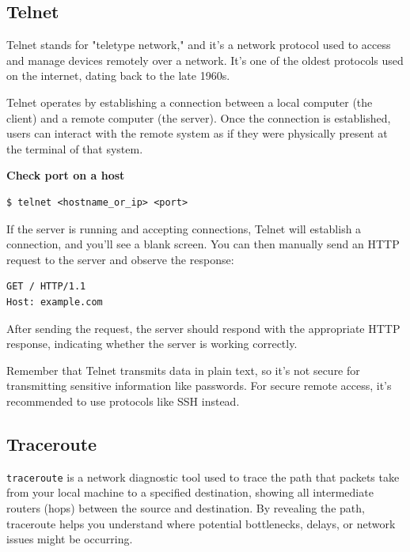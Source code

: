 \documentclass{article}
\newenvironment{blocktemplateIII}[1]{%
    \tcolorbox[beamer,%
    noparskip,breakable,
    ,colframe=Red,%
    colbacklower=LimeGreen!75!LightGreen,%
    title=#1]}%
    {\endtcolorbox}
\newenvironment{codetemplate}[1][]{%
  \mybasecolorbox[#1]
  \itshape
}{%
  \endmybasecolorbox
}
\begin{document}
\subsection{Telnet}

Telnet stands for "teletype network," and it's a network protocol used to access and manage devices remotely over a network. It's one of the oldest protocols used on the internet, dating back to the late 1960s.

Telnet operates by establishing a connection between a local computer (the client) and a remote computer (the server). Once the connection is established, users can interact with the remote system as if they were physically present at the terminal of that system.

\textbf{Check port on a host}
\begin{codetemplate}
\begin{verbatim}
$ telnet <hostname_or_ip> <port>
\end{verbatim}
\end{codetemplate}

If the server is running and accepting connections, Telnet will establish a connection, and you'll see a blank screen. You can then manually send an HTTP request to the server and observe the response:

\begin{codetemplate}
\begin{verbatim}
GET / HTTP/1.1
Host: example.com
\end{verbatim}
\end{codetemplate}

After sending the request, the server should respond with the appropriate HTTP response, indicating whether the server is working correctly.

\begin{blocktemplateIII}{WARNING}
Remember that Telnet transmits data in plain text, so it's not secure for transmitting sensitive information like passwords. For secure remote access, it's recommended to use protocols like SSH instead.
\end{blocktemplateIII}

\subsection{Traceroute}
\verb|traceroute| is a network diagnostic tool used to trace the path that packets take from your local machine to a specified destination, showing all intermediate routers (hops) between the source and destination. By revealing the path, traceroute helps you understand where potential bottlenecks, delays, or network issues might be occurring.
\end{document}

